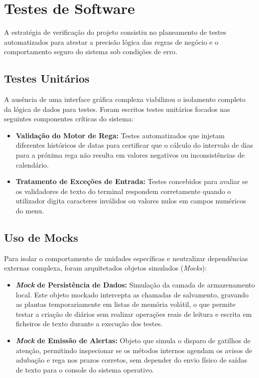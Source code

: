 \documentclass[a4paper,12pt]{article}
\begin{document}
\section{Testes de Software}

A estratégia de verificação do projeto consistiu no planeamento de testes automatizados para atestar a precisão lógica das regras de negócio e o comportamento seguro do sistema sob condições de erro.

\subsection{Testes Unitários}
A ausência de uma interface gráfica complexa viabilizou o isolamento completo da lógica de dados para testes. Foram escritos testes unitários focados nas seguintes componentes críticas do sistema:
\begin{itemize}[leftmargin=*]
    \item \textbf{Validação do Motor de Rega:} Testes automatizados que injetam diferentes históricos de datas para certificar que o cálculo do intervalo de dias para a próxima rega não resulta em valores negativos ou inconsistências de calendário.
    \item \textbf{Tratamento de Exceções de Entrada:} Testes concebidos para avaliar se os validadores de texto do terminal respondem corretamente quando o utilizador digita caracteres inválidos ou valores nulos em campos numéricos do menu.
\end{itemize}

\subsection{Uso de Mocks}
Para isolar o comportamento de unidades específicas e neutralizar dependências externas complexa, foram arquitetados objetos simulados (\textit{Mocks}):
\begin{itemize}[leftmargin=*]
    \item \textbf{\textit{Mock} de Persistência de Dados:} Simulação da camada de armazenamento local. Este objeto mockado intercepta as chamadas de salvamento, gravando as plantas temporariamente em listas de memória volátil, o que permite testar a criação de diários sem realizar operações reais de leitura e escrita em ficheiros de texto durante a execução dos testes.
    \item \textbf{\textit{Mock} de Emissão de Alertas:} Objeto que simula o disparo de gatilhos de atenção, permitindo inspecionar se os métodos internos agendam os avisos de adubação e rega nos prazos corretos, sem depender do envio físico de saídas de texto para o console do sistema operativo.
\end{itemize}
\end{document}
